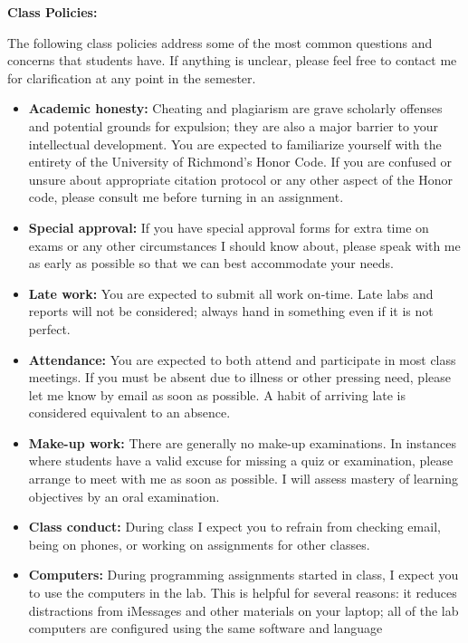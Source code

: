 \documentclass[12pt]{article}
\begin{document}
\bigskip

\textbf{Class Policies:} \vspace{6pt}

The following class policies address some of the most common
questions and concerns that students have. If anything is
unclear, please feel free to contact me for clarification at
any point in the semester.

\begin{itemize}\setlength\itemsep{0em}
\item \textbf{Academic honesty:} Cheating and plagiarism are grave scholarly
offenses and potential grounds
for expulsion; they are also a major barrier to your intellectual development.
You are expected to familiarize yourself with the entirety of the
University of Richmond’s Honor Code. If you are confused or unsure about
appropriate citation protocol or any other aspect of the Honor code,
please consult me before turning in an assignment.
\item \textbf{Special approval:} If you have special approval forms for extra
time on exams or any other circumstances I should know about, please speak
with me as early as possible so that we can best accommodate your needs.
\item \textbf{Late work:} You are expected to submit all work on-time. Late labs
and reports will not be considered; always hand in something even if it is not
perfect.
\item \textbf{Attendance:} You are expected to both attend and participate in most
class meetings. If you must be absent due to illness or other pressing
need, please let me know by email as soon as possible. A habit of arriving
late is considered equivalent to an absence.
\item \textbf{Make-up work:} There are generally no make-up examinations.
In instances where students have a valid excuse for missing a quiz or
examination, please arrange to meet with me as soon as possible. I will
assess mastery of learning objectives by an oral examination.
\item \textbf{Class conduct:} During class I expect you to refrain from checking
email, being on phones, or working on assignments for other classes.
\item \textbf{Computers:} During programming assignments started in class, I expect you
to use the computers in the lab. This is helpful for several reasons: it
reduces distractions from iMessages and other materials on your laptop;
all of the lab computers are configured using the same software and language

\end{itemize}
\end{document}
